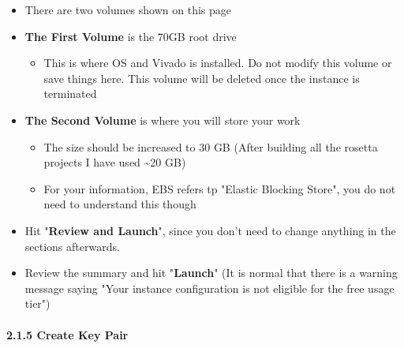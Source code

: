 \documentclass[]{article}
\let\oldparagraph\paragraph
\renewcommand{\paragraph}[1]{\oldparagraph{#1}\mbox{}}
\begin{document}
\begin{itemize}
\item
  There are two volumes shown on this page 
\item
  \textbf{The First Volume} is the 70GB root drive

  \begin{itemize}
  \item
    This is where OS and Vivado is installed. Do not modify this volume
    or save things here. This volume will be deleted once the instance
    is terminated
  \end{itemize}
\item
  \textbf{The Second Volume} is where you will store your work

  \begin{itemize}
  \item
    The size should be increased to 30 GB (After building all the
    rosetta projects I have used \textasciitilde{}20 GB)
  \item
    For your information, EBS refers tp "Elastic Blocking Store", you do
    not need to understand this though
  \end{itemize}
\item
  Hit "\textbf{Review and Launch}", since you don't need to change
  anything in the sections afterwards.
\item
  Review the summary and hit "\textbf{Launch}" (It is normal that there
  is a warning message saying "Your instance configuration is not
  eligible for the free usage tier")
\end{itemize}

\hypertarget{header-n156}{%
\paragraph{2.1.5 Create Key Pair}\label{header-n156}}
\end{document}
